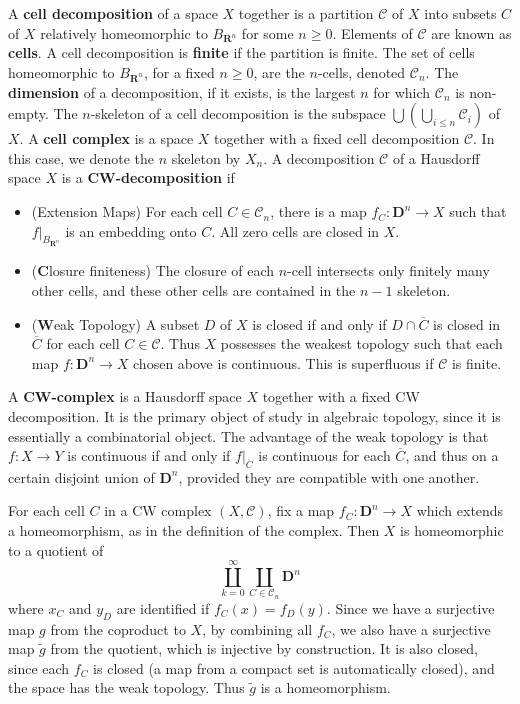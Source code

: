 A {\bf cell decomposition} of a space $X$ together is a partition $\mathcal{C}$ of $X$ into subsets $C$ of $X$ relatively homeomorphic to $B_{\mathbf{R}^n}$ for some $n \geq 0$. Elements of $\mathcal{C}$ are known as {\bf cells}. A cell decomposition is {\bf finite} if the partition is finite. The set of cells homeomorphic to $B_{\mathbf{R}^n}$, for a fixed $n \geq 0$, are the $n$-cells, denoted $\mathcal{C}_n$. The {\bf dimension} of a decomposition, if it exists, is the largest $n$ for which $\mathcal{C}_n$ is non-empty. The $n$-skeleton of a cell decomposition is the subspace $\bigcup \left( \bigcup_{i \leq n} \mathcal{C}_i \right)$ of $X$. A {\bf cell complex} is a space $X$ together with a fixed cell decomposition $\mathcal{C}$. In this case, we denote the $n$ skeleton by $X_n$. A decomposition $\mathcal{C}$ of a Hausdorff space $X$ is a {\bf CW-decomposition} if
%
\begin{itemize}
    \item (Extension Maps) For each cell $C \in \mathcal{C}_n$, there is a map $f_C: \mathbf{D}^n \to X$ such that $f|_{B_{\mathbf{R}^n}}$ is an embedding onto $C$. All zero cells are closed in $X$.
    \item ({\bf C}losure finiteness) The closure of each $n$-cell intersects only finitely many other cells, and these other cells are contained in the $n-1$ skeleton.
    \item ({\bf W}eak Topology) A subset $D$ of $X$ is closed if and only if $D \cap \overline{C}$ is closed in $\overline{C}$ for each cell $C \in \mathcal{C}$. Thus $X$ possesses the weakest topology such that each map $f: \mathbf{D}^n \to X$ chosen above is continuous. This is superfluous if $\mathcal{C}$ is finite.
\end{itemize}
%
A {\bf CW-complex} is a Hausdorff space $X$ together with a fixed CW decomposition. It is the primary object of study in algebraic topology, since it is essentially a combinatorial object. The advantage of the weak topology is that $f: X \to Y$ is continuous if and only if $f|_{\overline{C}}$ is continuous for each $\overline{C}$, and thus on a certain disjoint union of $\mathbf{D}^n$, provided they are compatible with one another.

For each cell $C$ in a CW complex $(X,\mathcal{C})$, fix a map $f_C: \mathbf{D}^n \to X$ which extends a homeomorphism, as in the definition of the complex. Then $X$ is homeomorphic to a quotient of
%
\[ \coprod_{k = 0}^\infty \coprod_{C \in \mathcal{C}_n} \mathbf{D}^n \]
%
where $x_C$ and $y_D$ are identified if $f_C(x) = f_D(y)$. Since we have a surjective map $g$ from the coproduct to $X$, by combining all $f_C$, we also have a surjective map $\tilde{g}$ from the quotient, which is injective by construction. It is also closed, since each $f_C$ is closed (a map from a compact set is automatically closed), and the space has the weak topology. Thus $\tilde{g}$ is a homeomorphism.

